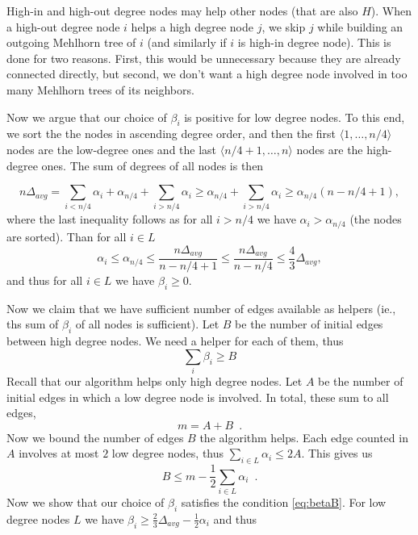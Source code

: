 \documentclass{article}
\begin{document}
High-in and high-out degree nodes may help other nodes (that are also $H$).
When a high-out degree node $i$ helps a high degree node $j$, we skip $j$ while building an outgoing Mehlhorn tree of $i$ (and similarly if $i$ is high-in degree node).
This is done for two reasons. First, this would be unnecessary because they are already connected directly, but second, we don't want a high degree node involved in too many Mehlhorn trees of its neighbors.


\medskip

Now we argue that our choice of $\beta_i$ is positive for low degree nodes.
To this end, we sort the the nodes in ascending degree order, and then the first
$\langle 1, \ldots, n/4\rangle$ nodes are the low-degree ones and
the last $\langle n/4 +1, \ldots, n\rangle$ nodes are the high-degree ones.
The sum of degrees of all nodes is then

$$n\Delta_{avg} = \sum_{i < n/4} \alpha_i + \alpha_{n/4} + \sum_{i > n/4} \alpha_i \geq \alpha_{n/4} + \sum_{i > n/4} \alpha_i \geq \alpha_{n/4}(n-n/4+1),$$
where the last inequality follows as 
for all $i > n/4$ we have $\alpha_i > \alpha_{n/4}$ (the nodes are sorted).
Than for all $i \in L$
$$\alpha_i \leq \alpha_{n/4} \leq \frac{n\Delta_{avg}}{n-n/4+1} \leq \frac{n\Delta_{avg}}{n-n/4} \leq \frac{4}{3}\Delta_{avg},$$
and thus for all $i \in L$ we have $\beta_i \geq 0$.

\medskip

Now we claim that we have sufficient number of edges available as helpers
 (ie., ths sum of $\beta_i$ of all nodes is sufficient).
Let $B$ be the number of initial edges between high degree nodes.
We need a helper for each of them, thus
\begin{equation}
  \label{eq:betaB}
 \sum_i \beta_i \geq B
\end{equation}
Recall that our algorithm helps only high degree nodes.
Let $A$ be the number of initial edges in which a low degree node is involved.
In total, these sum to all edges,
$$m = A + B\enspace.$$
%
Now we bound the number of edges $B$ the algorithm helps.
Each edge counted in $A$ involves at most $2$ low degree nodes, thus
$\sum_{i \in L}\alpha_i \leq 2A$.
This gives us
$$B \leq m - \frac{1}{2}\sum_{i \in L}\alpha_i\enspace.$$
%
Now we show that our choice of $\beta_i$ satisfies the condition \eqref{eq:betaB}.
For low degree nodes $L$ we have   $\beta_i \geq \frac{2}{3}\Delta_{avg}-\frac{1}{2}\alpha_i$
and thus
\end{document}
